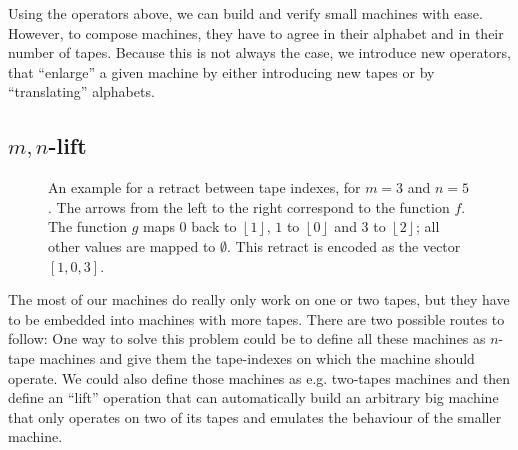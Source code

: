 \documentclass{psartcl}
\newcommand{\Some}[1]{\left\lfloor #1\right\rfloor}
\renewcommand{\None}{\emptyset}
\begin{document}
Using the operators above, we can build and verify small machines with ease.  However, to compose machines, they have to agree in their alphabet and in
their number of tapes.  Because this is not always the case, we introduce new operators, that ``enlarge'' a given machine by either introducing new
tapes or by ``translating'' alphabets.


\subsection{\texorpdfstring{$m,n$}{m,n}-lift}
\label{sub:m-n}

\begin{figure}
  \center
  \caption{An example for a retract between tape indexes, for $m=3$ and $n=5$.  The arrows from the left to the right correspond to the
    function $f$. The function $g$ maps $0$ back to $\Some{1}$, $1$ to $\Some{0}$ and $3$ to $\Some{2}$; all other values are mapped to $\None$.
  This retract is encoded as the vector $[1,0,3]$.}
  \label{fig:m-n-lift-example-mapping}
\end{figure}

The most of our machines do really only work on one or two tapes, but they have to be embedded into machines with more tapes.  There are two possible
routes to follow: One way to solve this problem could be to define all these machines as $n$-tape machines and give them the tape-indexes on which the
machine should operate.  We could also define those machines as e.g. two-tapes machines and then define an ``lift'' operation that can automatically
build an arbitrary big machine that only operates on two of its tapes and emulates the behaviour of the smaller machine.
\end{document}
